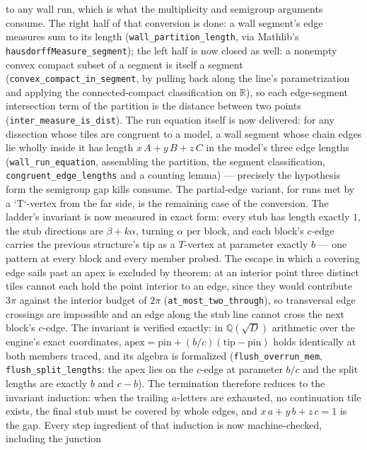 \documentclass[11pt,reqno]{amsart}
\theoremstyle{plain}
\theoremstyle{definition}
\begin{document}
to any wall run, which is what the multiplicity and semigroup arguments consume. The right half of that conversion is done: a wall segment's edge measures sum to its length
(\texttt{wall\_partition\_length}, via Mathlib's \texttt{hausdorffMeasure\_segment}); the left
half is now closed as well: a nonempty convex compact subset of a segment is itself a segment
(\texttt{convex\_compact\_in\_segment}, by pulling back along the line's parametrization and
applying the connected-compact classification on $\mathbb R$), so each edge-segment intersection
term of the partition is the distance between two points
(\texttt{inter\_measure\_is\_dist}). The run equation itself is now delivered: for any dissection whose tiles are congruent to a
model, a wall segment whose chain edges lie wholly inside it has length
$x\,A+y\,B+z\,C$ in the model's three edge lengths
(\texttt{wall\_run\_equation}, assembling the partition, the segment classification,
\texttt{congruent\_edge\_lengths} and a counting lemma) --- precisely the hypothesis form the
semigroup gap kills consume. The partial-edge variant, for runs met by a `T`-vertex from the far
side, is the remaining case of the conversion. The ladder's invariant is now measured in exact
form: every stub has length exactly $1$, the stub directions are $\beta+k\alpha$, turning
$\alpha$ per block, and each block's $c$-edge carries the previous structure's tip as a
$T$-vertex at parameter exactly $b$ --- one pattern at every block and every member probed. The
escape in which a covering edge sails past an apex is excluded by theorem: at an interior point
three distinct tiles cannot each hold the point interior to an edge, since they would contribute
$3\pi$ against the interior budget of $2\pi$
(\texttt{at\_most\_two\_through}), so transversal edge crossings are impossible and an edge
along the stub line cannot cross the next block's $c$-edge. The invariant is verified exactly: in $\mathbb Q(\sqrt D)$ arithmetic over the engine's exact
coordinates, $\mathrm{apex}=\mathrm{pin}+(b/c)(\mathrm{tip}-\mathrm{pin})$ holds identically at
both members traced, and its algebra is formalized
(\texttt{flush\_overrun\_mem}, \texttt{flush\_split\_lengths}: the apex lies on the $c$-edge
at parameter $b/c$ and the split lengths are exactly $b$ and $c-b$). The termination therefore
reduces to the invariant induction: when the trailing $a$-letters are exhausted, no continuation
tile exists, the final stub must be covered by whole edges, and $x\,a+y\,b+z\,c=1$ is the gap.
Every step ingredient of that induction is now machine-checked, including the junction
\end{document}
